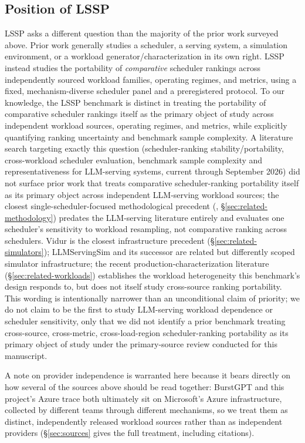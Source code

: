 \subsection{Position of LSSP}
\label{sec:related-position}

LSSP asks a different question than the majority of the prior work surveyed
above. Prior work generally studies a scheduler, a serving system, a
simulation environment, or a workload generator/characterization in its own
right. LSSP instead studies the portability of \emph{comparative} scheduler
rankings across independently sourced workload families, operating regimes,
and metrics, using a fixed, mechanism-diverse scheduler panel and a
preregistered protocol. To our knowledge, the LSSP benchmark is distinct in
treating the portability of comparative scheduler rankings itself as the
primary object of study across independent workload sources, operating
regimes, and metrics, while explicitly quantifying ranking uncertainty and
benchmark sample complexity. A literature search targeting exactly this
question (scheduler-ranking stability/portability, cross-workload
scheduler evaluation, benchmark sample complexity and representativeness
for LLM-serving systems, current through September 2026) did not surface
prior work that treats comparative scheduler-ranking portability itself as
its primary object across independent LLM-serving workload sources; the
closest single-scheduler-focused methodological precedent
(\citet{zakay2014resampling}, \S\ref{sec:related-methodology}) predates
the LLM-serving literature entirely and evaluates one scheduler's
sensitivity to workload resampling, not comparative ranking across
schedulers. Vidur is the closest infrastructure precedent
(\S\ref{sec:related-simulators}); LLMServingSim and its successor are
related but differently scoped simulator infrastructure; the recent
production-characterization literature
(\S\ref{sec:related-workloads}) establishes the workload heterogeneity this
benchmark's design responds to, but does not itself study cross-source
ranking portability. This wording is intentionally narrower than an
unconditional claim of priority; we do not claim to be the first to study
LLM-serving workload dependence or scheduler sensitivity, only that we did
not identify a prior benchmark treating cross-source, cross-metric,
cross-load-region scheduler-ranking portability as its primary object of
study under the primary-source review conducted for this manuscript.

A note on provider independence is warranted here because it bears
directly on how several of the sources above should be read together:
BurstGPT and this project's Azure trace both ultimately sit on Microsoft's
Azure infrastructure, collected by different teams through different
mechanisms, so we treat them as distinct, independently released workload
sources rather than as independent providers
(\S\ref{sec:sources} gives the full treatment, including citations).
